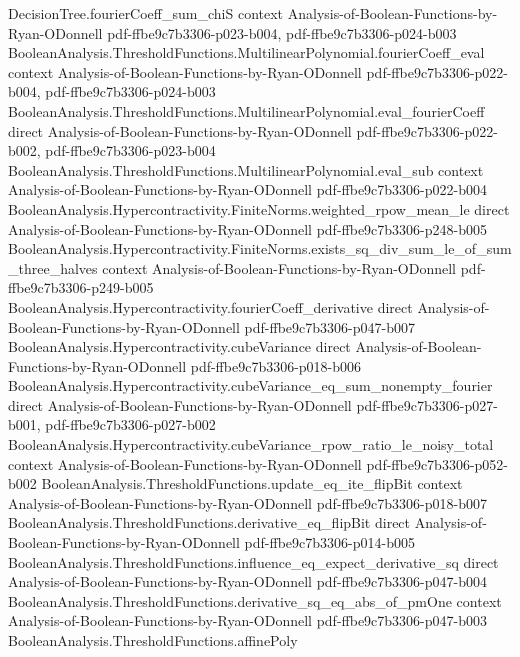 \begin{lemma}
  {DecisionTree.fourierCoeff_sum_chiS}
  {context}
  {Analysis-of-Boolean-Functions-by-Ryan-ODonnell}
  {pdf-ffbe9c7b3306-p023-b004,
    pdf-ffbe9c7b3306-p024-b003}
\proofstep
  {BooleanAnalysis.ThresholdFunctions.MultilinearPolynomial.fourierCoeff_eval}
  {context}
  {Analysis-of-Boolean-Functions-by-Ryan-ODonnell}
  {pdf-ffbe9c7b3306-p022-b004,
    pdf-ffbe9c7b3306-p024-b003}
\proofstep
  {BooleanAnalysis.ThresholdFunctions.MultilinearPolynomial.eval_fourierCoeff}
  {direct}
  {Analysis-of-Boolean-Functions-by-Ryan-ODonnell}
  {pdf-ffbe9c7b3306-p022-b002,
    pdf-ffbe9c7b3306-p023-b004}
\proofstep
  {BooleanAnalysis.ThresholdFunctions.MultilinearPolynomial.eval_sub}
  {context}
  {Analysis-of-Boolean-Functions-by-Ryan-ODonnell}
  {pdf-ffbe9c7b3306-p022-b004}
\proofstep
  {BooleanAnalysis.Hypercontractivity.FiniteNorms.weighted_rpow_mean_le}
  {direct}
  {Analysis-of-Boolean-Functions-by-Ryan-ODonnell}
  {pdf-ffbe9c7b3306-p248-b005}
\proofstep
  {BooleanAnalysis.Hypercontractivity.FiniteNorms.exists_sq_div_sum_le_of_sum_three_halves}
  {context}
  {Analysis-of-Boolean-Functions-by-Ryan-ODonnell}
  {pdf-ffbe9c7b3306-p249-b005}
\proofstep
  {BooleanAnalysis.Hypercontractivity.fourierCoeff_derivative}
  {direct}
  {Analysis-of-Boolean-Functions-by-Ryan-ODonnell}
  {pdf-ffbe9c7b3306-p047-b007}
\proofstep
  {BooleanAnalysis.Hypercontractivity.cubeVariance}
  {direct}
  {Analysis-of-Boolean-Functions-by-Ryan-ODonnell}
  {pdf-ffbe9c7b3306-p018-b006}
\proofstep
  {BooleanAnalysis.Hypercontractivity.cubeVariance_eq_sum_nonempty_fourier}
  {direct}
  {Analysis-of-Boolean-Functions-by-Ryan-ODonnell}
  {pdf-ffbe9c7b3306-p027-b001,
    pdf-ffbe9c7b3306-p027-b002}
\proofstep
  {BooleanAnalysis.Hypercontractivity.cubeVariance_rpow_ratio_le_noisy_total}
  {context}
  {Analysis-of-Boolean-Functions-by-Ryan-ODonnell}
  {pdf-ffbe9c7b3306-p052-b002}
\proofstep
  {BooleanAnalysis.ThresholdFunctions.update_eq_ite_flipBit}
  {context}
  {Analysis-of-Boolean-Functions-by-Ryan-ODonnell}
  {pdf-ffbe9c7b3306-p018-b007}
\proofstep
  {BooleanAnalysis.ThresholdFunctions.derivative_eq_flipBit}
  {direct}
  {Analysis-of-Boolean-Functions-by-Ryan-ODonnell}
  {pdf-ffbe9c7b3306-p014-b005}
\proofstep
  {BooleanAnalysis.ThresholdFunctions.influence_eq_expect_derivative_sq}
  {direct}
  {Analysis-of-Boolean-Functions-by-Ryan-ODonnell}
  {pdf-ffbe9c7b3306-p047-b004}
\proofstep
  {BooleanAnalysis.ThresholdFunctions.derivative_sq_eq_abs_of_pmOne}
  {context}
  {Analysis-of-Boolean-Functions-by-Ryan-ODonnell}
  {pdf-ffbe9c7b3306-p047-b003}
\proofstep
  {BooleanAnalysis.ThresholdFunctions.affinePoly}

\end{lemma}
